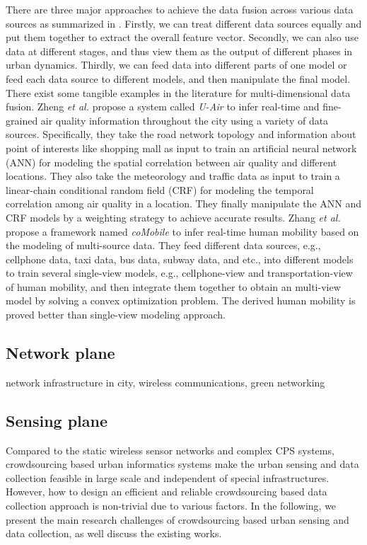 There are three major approaches to achieve the data fusion across various data sources as summarized in \cite{urbancomp}. Firstly, we can treat different data sources equally and put them together to extract the overall feature vector. Secondly, we can also use data at different stages, and thus view them as the output of different phases in urban dynamics. Thirdly, we can feed data into different parts of one model or feed each data source to different models, and then manipulate the final model. There exist some tangible examples in the literature for multi-dimensional data fusion. Zheng \textit{et al.} \cite{uair} propose a system called \textit{U-Air} to infer real-time and fine-grained air quality information throughout the city using a variety of data sources. Specifically, they take the road network topology and information about point of interests like shopping mall as input to train an artificial neural network (ANN) for modeling the spatial correlation between air quality and different locations. They also take the meteorology and traffic data as input to train a linear-chain conditional random field (CRF) for modeling the temporal correlation among air quality in a location. They finally manipulate the ANN and CRF models by a weighting strategy to achieve accurate results. Zhang \textit{et al.} \cite{comobile} propose a framework named \textit{coMobile} to infer real-time human mobility based on the modeling of multi-source data. They feed different data sources, e.g., cellphone data, taxi data, bus data, subway data, and etc., into different models to train several single-view models, e.g., cellphone-view and transportation-view of human mobility, and then integrate them together to obtain an multi-view model by solving a convex optimization problem. The derived human mobility is proved better than single-view modeling approach.  


\subsection{Network plane}
network infrastructure in city, wireless communications, green networking

\subsection{Sensing plane}

Compared to the static wireless sensor networks and complex CPS systems, crowdsourcing based urban informatics systems make the urban sensing and data collection feasible in large scale and independent of special infrastructures. However, how to design an efficient and reliable crowdsourcing based data collection approach is non-trivial due to various factors. In the following, we present the main research challenges of crowdsourcing based urban sensing and data collection, as well discuss the existing works.

